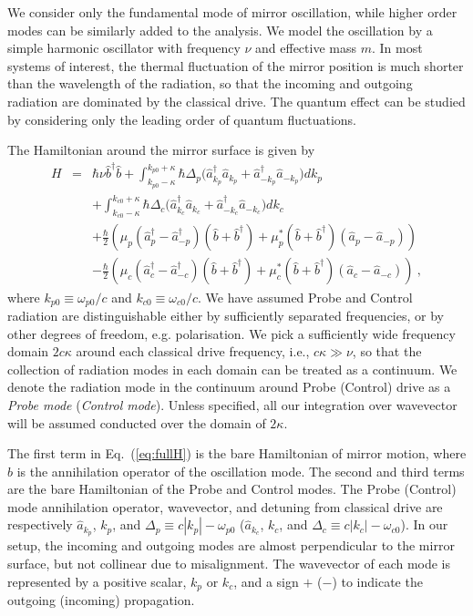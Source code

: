 \documentclass[aps, pra, reprint, amsmath, amssymb, groupedaddress, acknowledgments]{revtex4-1}
\begin{document}
We consider only the fundamental mode of mirror oscillation, while higher order modes can be similarly added to the analysis.  We model the oscillation by a simple harmonic oscillator with frequency $\nu$ and effective mass $m$.  In most systems of interest, the thermal fluctuation of the mirror position is much shorter than the wavelength of the radiation, so that the incoming and outgoing radiation are dominated by the classical drive.  The quantum effect can be studied by considering only the leading order of quantum fluctuations.

The Hamiltonian around the mirror surface is given by
\begin{eqnarray}\label{eq:fullH}
H&=& \hbar \nu \hat{b}^\dag \hat{b}+ \int_{k_{p0}-\kappa}^{k_{p0}+\kappa} \hbar \Delta_{p} \big(\hat{a}^\dag_{k_p}\hat{a}_{k_p} + \hat{a}^\dag_{-k_p}\hat{a}_{-k_p} \big) dk_p  \\
&&+ \int_{k_{c0}-\kappa}^{k_{c0}+\kappa} \hbar \Delta_{c} \big( \hat{a}^\dag_{k_c}\hat{a}_{k_c} + \hat{a}^\dag_{-k_c}\hat{a}_{-k_c} \big) dk_c\nonumber \\
&&+ \frac{\hbar}{2 } \left(\mu_p (\hat{a}^\dag_{p}  -\hat{a}^\dag_{-p})(\hat{b}+\hat{b}^\dag)  +\mu_p^\ast (\hat{b}+\hat{b}^\dag) (\hat{a}_{p} -\hat{a}_{-p} )   \right) \nonumber \\
&&- \frac{\hbar}{2}\left( \mu_c  (\hat{a}^\dag_{c} -\hat{a}^\dag_{-c}) (\hat{b}+\hat{b}^\dag) + \mu_c^\ast (\hat{b}+\hat{b}^\dag) (\hat{a}_{c}  -\hat{a}_{-c} )  \right)~, \nonumber 
\end{eqnarray}
where $k_{p0}\equiv \omega_{p0}/c$ and $k_{c0}\equiv \omega_{c0}/c$.
We have assumed Probe and Control radiation are distinguishable either by sufficiently separated frequencies, or by other degrees of freedom, e.g. polarisation.
We pick a sufficiently wide frequency domain $2c\kappa$ around each classical drive frequency, i.e., $c\kappa \gg \nu$, so that the collection of radiation modes in each domain can be treated as a continuum.  We denote the radiation mode in the continuum around Probe (Control) drive as a \textit{Probe mode} (\textit{Control mode}).   Unless specified, all our integration over wavevector will be assumed conducted over the domain of $2\kappa$.

The first term in Eq.~(\ref{eq:fullH}) is the bare Hamiltonian of mirror motion, where $\hat{b}$ is the annihilation operator of the oscillation mode.  The second and third terms are the bare Hamiltonian of the Probe and Control modes.  The Probe (Control) mode annihilation operator, wavevector, and detuning from classical drive are respectively $\hat{a}_{k_p}$, $k_p$, and $\Delta_p \equiv c|k_p| - \omega_{p0} $ ($\hat{a}_{k_c}$, $k_c$, and $\Delta_c \equiv c|k_c| - \omega_{c0} $).    
In our setup, the incoming and outgoing modes are almost perpendicular to the mirror surface, but not collinear due to misalignment.  The wavevector of each mode is represented by a positive scalar, $k_p$ or $k_c$, and a sign $+$ ($-$) to indicate the outgoing (incoming) propagation.
\end{document}

